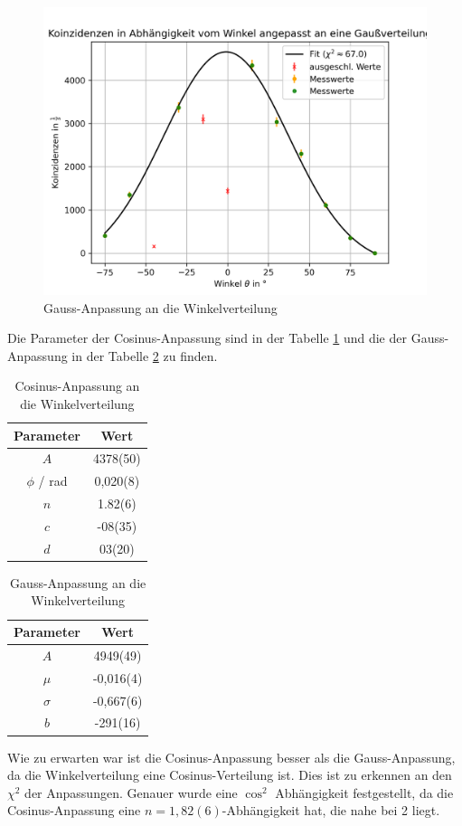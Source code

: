 \documentclass{article}
\begin{document}
\begin{figure}[H]
    \centering
    \includegraphics[width=1\textwidth]{figures/gaussAnpassung.png}
    \caption{Gauss-Anpassung an die Winkelverteilung}
    \label{fig:WinkelverteilungGauss}
\end{figure} 
Die Parameter der Cosinus-Anpassung sind in der Tabelle \ref{tab:CosinusAnpassungWinkelverteilung} und die der Gauss-Anpassung in der Tabelle \ref{tab:GaussAnpassungWinkelverteilung} zu finden.
\begin{table}[H]
    \centering
    \caption{Cosinus-Anpassung an die Winkelverteilung}
    \begin{tabular}{|c|c|}
        \hline
        Parameter & Wert \\ \hline
        $A$ & 4378(50) \\ \hline
        $\phi$ / rad & 0,020(8) \\ \hline
        $n$ & 1.82(6) \\ \hline
        $c$ & -08(35) \\ \hline
        $d$ & 03(20) \\ \hline
    \end{tabular}
    \label{tab:CosinusAnpassungWinkelverteilung}
\end{table}
\begin{table}[H]
    \centering
    \caption{Gauss-Anpassung an die Winkelverteilung}
    \begin{tabular}{|c|c|}
        \hline
        Parameter & Wert \\ \hline
        $A$ & 4949(49) \\ \hline
        $\mu$ & -0,016(4) \\ \hline
        $\sigma$ & -0,667(6) \\ \hline
        $b$ & -291(16) \\ \hline
    \end{tabular}
    \label{tab:GaussAnpassungWinkelverteilung}
\end{table}
Wie zu erwarten war ist die Cosinus-Anpassung besser als die Gauss-Anpassung, da die Winkelverteilung eine Cosinus-Verteilung ist. Dies ist zu erkennen an den $\chi^2$ der Anpassungen.
Genauer wurde eine $\cos^2$ Abhängigkeit festgestellt, da die Cosinus-Anpassung eine $n=1,82(6)$-Abhängigkeit hat, die nahe bei 2 liegt.
\end{document}
